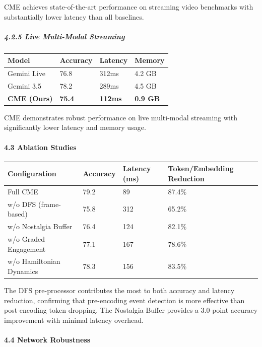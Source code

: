\documentclass[
  11pt,
  a4paper,
]{article}
\begin{document}
CME achieves state-of-the-art performance on streaming video benchmarks
with substantially lower latency than all baselines.

\subparagraph{4.2.5 Live Multi-Modal
Streaming}\label{live-multi-modal-streaming}

\begin{longtable}[]{@{}llll@{}}
\toprule\noalign{}
Model & Accuracy & Latency & Memory \\
\midrule\noalign{}
\endhead
\bottomrule\noalign{}
\endlastfoot
Gemini Live & 76.8 & 312ms & 4.2 GB \\
Gemini 3.5 & 78.2 & 289ms & 4.5 GB \\
\textbf{CME (Ours)} & \textbf{75.4} & \textbf{112ms} & \textbf{0.9
GB} \\
\end{longtable}

CME demonstrates robust performance on live multi-modal streaming with
significantly lower latency and memory usage.

\paragraph{4.3 Ablation Studies}\label{ablation-studies}

\begin{longtable}[]{@{}llll@{}}
\toprule\noalign{}
Configuration & Accuracy & Latency (ms) & Token/Embedding Reduction \\
\midrule\noalign{}
\endhead
\bottomrule\noalign{}
\endlastfoot
Full CME & 79.2 & 89 & 87.4\% \\
w/o DFS (frame-based) & 75.8 & 312 & 65.2\% \\
w/o Nostalgia Buffer & 76.4 & 124 & 82.1\% \\
w/o Graded Engagement & 77.1 & 167 & 78.6\% \\
w/o Hamiltonian Dynamics & 78.3 & 156 & 83.5\% \\
\end{longtable}

The DFS pre-processor contributes the most to both accuracy and latency
reduction, confirming that pre-encoding event detection is more
effective than post-encoding token dropping. The Nostalgia Buffer
provides a 3.0-point accuracy improvement with minimal latency overhead.

\paragraph{4.4 Network Robustness}\label{network-robustness}
\end{document}
